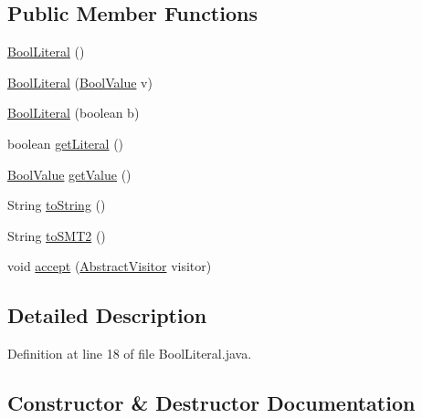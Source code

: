 \subsection*{Public Member Functions}
\begin{DoxyCompactItemize}
\item 
\hyperlink{classuran_1_1formula_1_1_bool_literal_ac6066e2fcca3769785815be4dec819b9}{Bool\+Literal} ()
\item 
\hyperlink{classuran_1_1formula_1_1_bool_literal_af68639700ee15a8c658bfaace2ba691a}{Bool\+Literal} (\hyperlink{classuran_1_1formula_1_1value_1_1_bool_value}{Bool\+Value} v)
\item 
\hyperlink{classuran_1_1formula_1_1_bool_literal_a78102e1eda6c6c868aab6663fc6de03f}{Bool\+Literal} (boolean b)
\item 
boolean \hyperlink{classuran_1_1formula_1_1_bool_literal_a243c1c5df4f18c1bb68e2910efd7c4d0}{get\+Literal} ()
\item 
\hyperlink{classuran_1_1formula_1_1value_1_1_bool_value}{Bool\+Value} \hyperlink{classuran_1_1formula_1_1_bool_literal_a2f7f9e45f86a8a619a933cc309a29da8}{get\+Value} ()
\item 
String \hyperlink{classuran_1_1formula_1_1_bool_literal_ac0ed2eff11f5277ce7046a183f402604}{to\+String} ()
\item 
String \hyperlink{classuran_1_1formula_1_1_bool_literal_ac0d33bb85933baa6d946da255ab0f830}{to\+S\+M\+T2} ()
\item 
void \hyperlink{classuran_1_1formula_1_1_bool_literal_aaaf68f3020c254408ea56255e21a6d1c}{accept} (\hyperlink{classuran_1_1formula_1_1visitor_1_1_abstract_visitor}{Abstract\+Visitor} visitor)
\end{DoxyCompactItemize}


\subsection{Detailed Description}


Definition at line 18 of file Bool\+Literal.\+java.



\subsection{Constructor \& Destructor Documentation}
\hypertarget{classuran_1_1formula_1_1_bool_literal_ac6066e2fcca3769785815be4dec819b9}{}
